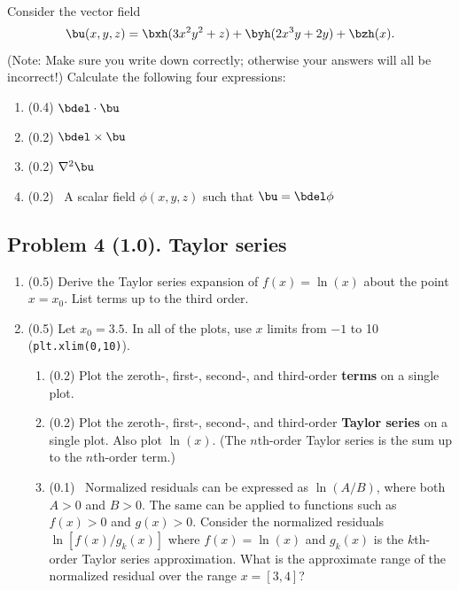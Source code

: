 \documentclass[11pt,titlepage,fleqn]{article}
\begin{document}
\citep[][p.~473, Problem~13]{SteinWysession} \\
Consider the vector field
%
\begin{equation}
\bu(x,y,z) = \bxh(3x^2y^2 + z) + \byh(2x^3y+2y) + \bzh(x).
\label{vec}
\end{equation}
%
(Note: Make sure you write down  correctly; otherwise your answers will all be incorrect!) Calculate the following four expressions:
%
\begin{enumerate}
\item (0.4) $\bdel \cdot \bu$
\item (0.2) $\bdel \times \bu$
\item (0.2) $\nabla^2\bu$
\item (0.2) \ptag\ A scalar field $\phi(x,y,z)$ such that $\bu=\bdel\phi$
\end{enumerate}


\subsection*{Problem 4 (1.0). Taylor series}

\begin{enumerate}
\item (0.5) Derive the Taylor series expansion of $f(x) = \ln(x)$ about the point $x = x_0$. List terms up to the third order.

\item (0.5) Let $x_0 = 3.5$. In all of the plots, use $x$ limits from $-1$ to 10 (\verb+plt.xlim(0,10)+).
%
\begin{enumerate}
\item (0.2) Plot the zeroth-, first-, second-, and third-order {\bf terms} on a single plot.

\item (0.2) Plot the zeroth-, first-, second-, and third-order {\bf Taylor series} on a single plot. Also plot $\ln(x)$.
(The $n$th-order Taylor series is the sum up to the $n$th-order term.) 

\item (0.1) \ptag\ Normalized residuals can be expressed as $\ln(A/B)$, where both $A > 0$ and $B > 0$.
The same can be applied to functions such as $f(x) > 0$ and $g(x) > 0$.
Consider the normalized residuals $\ln[ f(x) / g_k(x) ]$ where $f(x) = \ln(x)$ and $g_k(x)$ is the $k$th-order Taylor series approximation. What is the approximate range of the normalized residual over the range $x = [3,4]$?
\end{enumerate}

\end{enumerate}
\end{document}

